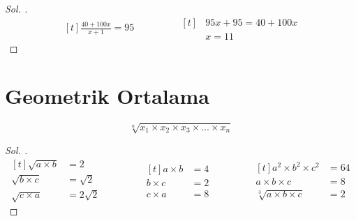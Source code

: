 \documentclass{article}
\theoremstyle{mytheoremstyle}
\theoremstyle{mytheoremstyle}
\theoremstyle{myproblemstyle}
\begin{document}
\begin{problem}
\end{problem}

\begin{proof}[\textit{ Sol. }]
  \begin{equation*}
    \begin{aligned}[t]
      \frac{40 + 100x}{x + 1} = 95
    \end{aligned}
    \qquad\qquad
    \begin{aligned}[t]
      &95x + 95 = 40 + 100x\\
      &x = 11
    \end{aligned}
  \end{equation*}
\end{proof}

\section{Geometrik Ortalama}

$$ \sqrt[n]{x_1 \times x_2 \times x_3 \times ... \times x_n} $$

\begin{problem}[a ile b'nin $ G.O = 2 $, b ile c'nin $ G.O = \sqrt{2} $, a ile c'nin $ G.O = 2\sqrt{2} $ ise $ a, b, c $'nin $ G.O = ? $]
\end{problem}

\begin{proof}[\textit{ Sol. }]
  \begin{equation*}
    \begin{aligned}[t]
      \sqrt{a \times b} &= 2\\
      \sqrt{b \times c} &= \sqrt{2}\\
      \sqrt{c \times a} &= 2\sqrt{2}
    \end{aligned}
    \qquad\qquad
    \begin{aligned}[t]
      a \times b &= 4\\
      b \times c &= 2\\
      c \times a &= 8
    \end{aligned}
    \qquad\qquad
    \begin{aligned}[t]
      a^2 \times b^2 \times c^2 &= 64\\
      a \times b \times c &= 8\\
      \sqrt[3]{a \times b \times c} &= 2
    \end{aligned}
  \end{equation*}
\end{proof}
\end{document}
